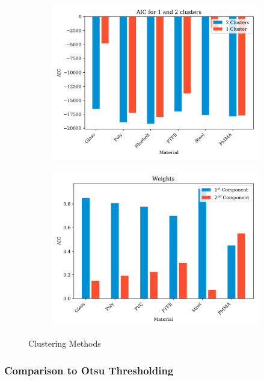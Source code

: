 \documentclass[a4paper,11pt]{article}
\begin{document}
\begin{figure}[b!]
    \centering
    \begin{subfigure}[b]{0.48\textwidth}
        \includegraphics[width=\textwidth]{figures/AIC.png}
    \end{subfigure}
    \begin{subfigure}[b]{0.48\textwidth}
        \includegraphics[width=\textwidth]{figures/weights.png}
    \end{subfigure}
    \caption{Clustering Methods}
    \label{n_bins}
\end{figure}

\subsubsection{Comparison to Otsu Thresholding}
\end{document}
